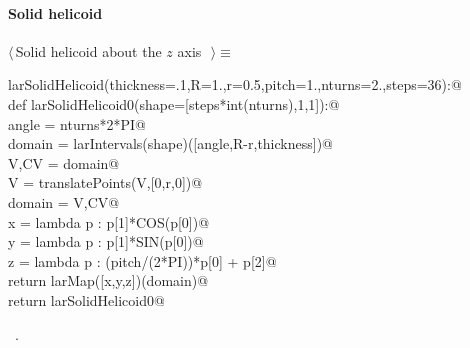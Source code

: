 \documentclass[11pt,oneside]{article}	%
\begin{document}
\paragraph{Solid helicoid}
\begin{flushleft} \small \label{scrap16}
$\langle\,$Solid helicoid about the $z$ axis\nobreak\ {\footnotesize {}}$\,\rangle\equiv$
\vspace{-1ex}
\begin{list}{}{} \item
\mbox{}\verb@def larSolidHelicoid(thickness=.1,R=1.,r=0.5,pitch=1.,nturns=2.,steps=36):@\\
\mbox{}\verb@   def larSolidHelicoid0(shape=[steps*int(nturns),1,1]):@\\
\mbox{}\verb@      angle = nturns*2*PI@\\
\mbox{}\verb@      domain = larIntervals(shape)([angle,R-r,thickness])@\\
\mbox{}\verb@      V,CV = domain@\\
\mbox{}\verb@      V = translatePoints(V,[0,r,0])@\\
\mbox{}\verb@      domain = V,CV@\\
\mbox{}\verb@      x = lambda p : p[1]*COS(p[0])@\\
\mbox{}\verb@      y = lambda p : p[1]*SIN(p[0])@\\
\mbox{}\verb@      z = lambda p : (pitch/(2*PI))*p[0] + p[2]@\\
\mbox{}\verb@      return larMap([x,y,z])(domain)@\\
\mbox{}\verb@   return larSolidHelicoid0@\\
\mbox{}\verb@@{\NWsep}
\end{list}
\vspace{-1ex}
\footnotesize\addtolength{\baselineskip}{-1ex}
\begin{list}{}{\setlength{\itemsep}{-\parsep}\setlength{\itemindent}{-\leftmargin}}
\item \NWtxtMacroRefIn\ .
\end{list}
\end{flushleft}
\end{document}
